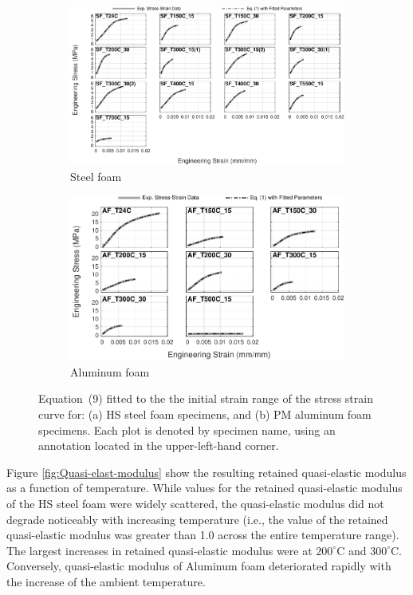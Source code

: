 \documentclass[review]{elsarticle}
\begin{document}
\begin{figure}
	\centering
	\begin{subfigure}{1.00\textwidth}
		\centering
		\includegraphics[width=0.90\linewidth]
		{Tex-Figures/Fig16a-quasi-Elastic-fit-Fe.pdf}
		\caption{Steel foam}
		\label{fig:qElas_Rich_Steel}
	\end{subfigure}

	\par\bigskip %

	\begin{subfigure}{1.00\textwidth}
		\centering
		\includegraphics[width=0.70\linewidth]
		{Tex-Figures/Fig16b-quasi-Elastic-fit-Al.pdf}
		\caption{Aluminum foam}
		\label{fig:qElas_Rich_Al}
	\end{subfigure}
	\caption{ Equation~(9) fitted to the the initial strain range of the stress strain curve for: (a) HS steel foam specimens, and (b) PM aluminum foam specimens. Each plot is denoted by specimen name, using an annotation located in the upper-left-hand corner.}
	\label{fig:Stress_strain_elast_fit}
\end{figure}

Figure \ref{fig:Quasi-elast-modulus} show the resulting retained quasi-elastic modulus as a function of temperature. While values for the retained quasi-elastic modulus of the HS steel foam were widely scattered, the quasi-elastic modulus did not degrade noticeably with increasing temperature (i.e., the value of the retained quasi-elastic modulus was greater than 1.0 across the entire temperature range). The largest increases in retained quasi-elastic modulus were at $200^{\circ}\mathrm{C}$ and $300^{\circ}\mathrm{C}$. Conversely, quasi-elastic modulus of Aluminum foam deteriorated rapidly with the increase of the ambient temperature.
\end{document}
